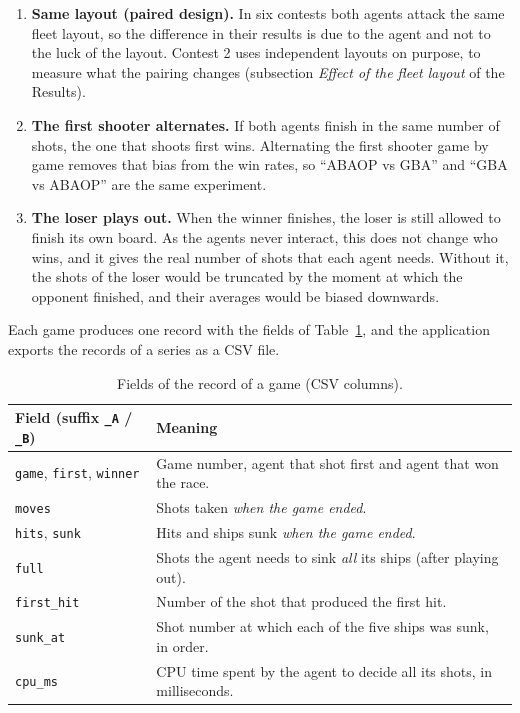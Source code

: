 \documentclass[letterpaper,11pt]{article} %
\renewcommand{\arraystretch}{1.8}
\begin{document}
\begin{enumerate}[label=\textbf{\arabic*.}]
    \item \textbf{Same layout (paired design).} In six contests both agents attack the same fleet layout, so the difference in their results is due to the agent and not to the luck of the layout. Contest 2 uses independent layouts on purpose, to measure what the pairing changes (subsection \emph{Effect of the fleet layout} of the Results).
    \item \textbf{The first shooter alternates.} If both agents finish in the same number of shots, the one that shoots first wins. Alternating the first shooter game by game removes that bias from the win rates, so ``ABAOP vs GBA'' and ``GBA vs ABAOP'' are the same experiment.
    \item \textbf{The loser plays out.} When the winner finishes, the loser is still allowed to finish its own board. As the agents never interact, this does not change who wins, and it gives the real number of shots that each agent needs. Without it, the shots of the loser would be truncated by the moment at which the opponent finished, and their averages would be biased downwards.
\end{enumerate}

Each game produces one record with the fields of Table~\ref{tab:fields}, and the application exports the records of a series as a CSV file.

\begin{table}[H]
    \centering
    \small
    \renewcommand{\arraystretch}{1.3}
    \begin{tabular}{|l|p{11.6cm}|}
        \hline
        \rowcolor{blue!20}
        Field (suffix \texttt{\_A} / \texttt{\_B}) & Meaning \\ \hline
        \texttt{game}, \texttt{first}, \texttt{winner} & Game number, agent that shot first and agent that won the race. \\ \hline
        \texttt{moves} & Shots taken \emph{when the game ended}. \\ \hline
        \texttt{hits}, \texttt{sunk} & Hits and ships sunk \emph{when the game ended}. \\ \hline
        \texttt{full} & Shots the agent needs to sink \emph{all} its ships (after playing out). \\ \hline
        \texttt{first\_hit} & Number of the shot that produced the first hit. \\ \hline
        \texttt{sunk\_at} & Shot number at which each of the five ships was sunk, in order. \\ \hline
        \texttt{cpu\_ms} & CPU time spent by the agent to decide all its shots, in milliseconds. \\ \hline
    \end{tabular}
    \caption{Fields of the record of a game (CSV columns).}
    \label{tab:fields}
\end{table}
\end{document}
